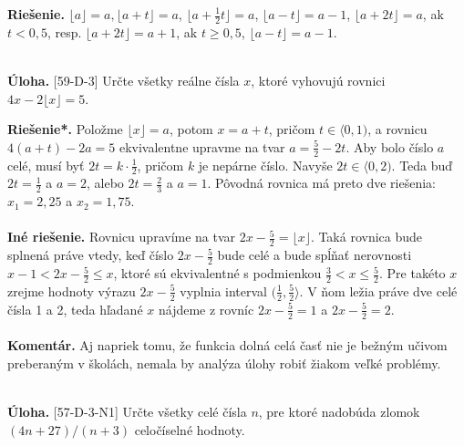 \documentclass[11pt,a4paper,oneside,final]{book}
\newcommand{\kom}{\textbf{Komentár.} }
\newcommand{\ul}{\textbf{Úloha.} }
\newcommand{\rie}{\textbf{Riešenie.} }
\newcommand{\rieh}{\textbf{Riešenie*.} }
\begin{document}
\rie $\lfloor a \rfloor = a, \lfloor a+t \rfloor= a$, $\lfloor a+\frac{1}{2}t\rfloor = a$, $\lfloor a-t \rfloor = a-1$, $\lfloor a+2t \rfloor = a$, ak $t<0,5$, resp. $\lfloor a+2t \rfloor = a+1$, ak $t\geq0,5$, $\lfloor a-t\rfloor=a-1$.\\
\\
\begin{tcolorbox}[breakable,notitle,boxrule=0pt,colback=light-gray,colframe=light-gray]\ul [59-D-3]
Určte všetky reálne čísla $x$, ktoré vyhovujú rovnici $4x - 2\lfloor x\rfloor = 5$.

\end{tcolorbox}

\rieh Položme $\lfloor x\rfloor = a$, potom $x = a + t$, pričom $t \in \langle 0, 1)$, a rovnicu $4(a + t)- 2a = 5$ ekvivalentne upravme na tvar $a=\frac{5}{2}- 2t$. Aby bolo číslo $a$ celé, musí byť $2t = k \cdot\frac{1}{2}$, pričom $k$ je nepárne číslo. Navyše $2t \in \langle 0, 2)$. Teda buď $2t =\frac{1}{2}$ a $a = 2$, alebo $2t =\frac{2}{3}$ a $a = 1$. Pôvodná rovnica má preto dve riešenia: $x_1 = 2,25$ a $x_2 = 1,75$.\\
\\
\textbf{Iné riešenie.} Rovnicu upravíme na tvar $2x - \frac{5}{2} = \lfloor x\rfloor$. Taká rovnica bude splnená práve vtedy, keď číslo $2x - \frac{5}{2}$ bude celé a bude spĺňať nerovnosti $x - 1 < 2x - \frac{5}{2} \leq x$, ktoré sú ekvivalentné s podmienkou $\frac{3}{2} < x \leq \frac{5}{2}$. Pre takéto $x$ zrejme hodnoty výrazu $2x - \frac{5}{2}$ vyplnia interval $( \frac{1}{2}, \frac{5}{2} \rangle $. V ňom ležia práve dve celé čísla 1 a 2, teda hľadané $x$ nájdeme z rovníc $2x - \frac{5}{2} = 1$ a $2x - \frac{5}{2} = 2$.\\
\\
\kom Aj napriek tomu, že funkcia dolná celá časť nie je bežným učivom preberaným v školách, nemala by analýza úlohy robiť žiakom veľké problémy.\\
\\
\begin{tcolorbox}[breakable,notitle,boxrule=0pt,colback=light-gray,colframe=light-gray]\ul [57-D-3-N1] Určte všetky celé čísla $n$, pre ktoré nadobúda zlomok $(4n + 27)/(n + 3)$ celočíselné
hodnoty.

\end{tcolorbox}
\end{document}
